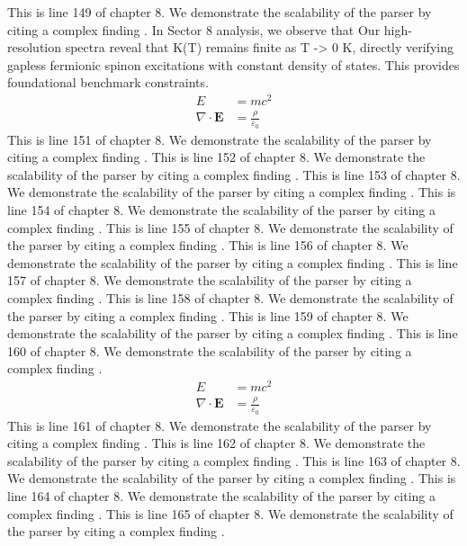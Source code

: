 This is line 149 of chapter 8. We demonstrate the scalability of the parser by citing a complex finding \cite{ref8_149}.
In Sector 8 analysis, we observe that Our high-resolution spectra reveal that K(T) remains finite as T -> 0 K, directly verifying gapless fermionic spinon excitations with constant density of states. This provides foundational benchmark constraints.
\begin{align*}
  E &= mc^2 \\
  \nabla \cdot \mathbf{E} &= \frac{\rho}{\varepsilon_0}
\end{align*}
This is line 151 of chapter 8. We demonstrate the scalability of the parser by citing a complex finding \cite{ref8_151}.
This is line 152 of chapter 8. We demonstrate the scalability of the parser by citing a complex finding \cite{ref8_152}.
This is line 153 of chapter 8. We demonstrate the scalability of the parser by citing a complex finding \cite{ref8_153}.
This is line 154 of chapter 8. We demonstrate the scalability of the parser by citing a complex finding \cite{ref8_154}.
This is line 155 of chapter 8. We demonstrate the scalability of the parser by citing a complex finding \cite{ref8_155}.
This is line 156 of chapter 8. We demonstrate the scalability of the parser by citing a complex finding \cite{ref8_156}.
This is line 157 of chapter 8. We demonstrate the scalability of the parser by citing a complex finding \cite{ref8_157}.
This is line 158 of chapter 8. We demonstrate the scalability of the parser by citing a complex finding \cite{ref8_158}.
This is line 159 of chapter 8. We demonstrate the scalability of the parser by citing a complex finding \cite{ref8_159}.
This is line 160 of chapter 8. We demonstrate the scalability of the parser by citing a complex finding \cite{ref8_160}.
\begin{align*}
  E &= mc^2 \\
  \nabla \cdot \mathbf{E} &= \frac{\rho}{\varepsilon_0}
\end{align*}
This is line 161 of chapter 8. We demonstrate the scalability of the parser by citing a complex finding \cite{ref8_161}.
This is line 162 of chapter 8. We demonstrate the scalability of the parser by citing a complex finding \cite{ref8_162}.
This is line 163 of chapter 8. We demonstrate the scalability of the parser by citing a complex finding \cite{ref8_163}.
This is line 164 of chapter 8. We demonstrate the scalability of the parser by citing a complex finding \cite{ref8_164}.
This is line 165 of chapter 8. We demonstrate the scalability of the parser by citing a complex finding \cite{ref8_165}.

